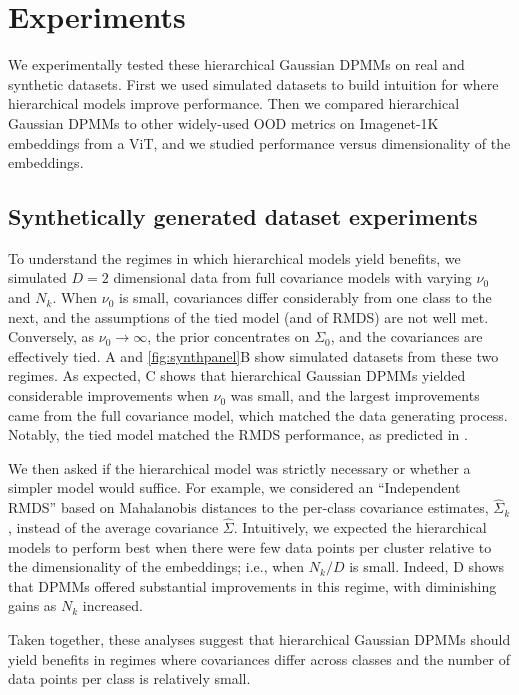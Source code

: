 \section{Experiments}
\label{sec:experiments}

We experimentally tested these hierarchical Gaussian DPMMs on real and synthetic datasets.
First we used simulated datasets to build intuition for where hierarchical models improve performance.
Then we compared hierarchical Gaussian DPMMs to other widely-used OOD metrics on Imagenet-1K embeddings from a ViT,
and we studied performance versus dimensionality of the embeddings.


\subsection{Synthetically generated dataset experiments}
To understand the regimes in which hierarchical models yield benefits, we
simulated $D=2$ dimensional data from full covariance models with varying
$\nu_0$ and $N_k$. When $\nu_0$ is small, covariances differ considerably from
one class to the next, and the assumptions of the tied model (and of RMDS) are
not well met. Conversely, as $\nu_0 \to \infty$, the prior concentrates on
$\Sigma_0$, and the covariances are effectively tied. A
and \ref{fig:synthpanel}B show simulated datasets from these two regimes. As
expected, C shows that hierarchical Gaussian DPMMs yielded
considerable improvements when $\nu_0$ was small, and the largest improvements
came from the full covariance model, which matched the data generating process.
Notably, the tied model matched the RMDS performance, as predicted in
.

We then asked if the hierarchical model was strictly necessary or whether a
simpler model would suffice. For example, we considered an ``Independent RMDS''
based on Mahalanobis distances to the per-class covariance estimates,
$\hat{\Sigma}_k$, instead of the average covariance $\hat{\Sigma}$.
Intuitively, we expected the hierarchical models to perform best when there
were few data points per cluster relative to the dimensionality of the
embeddings; i.e., when $N_k/D$ is small. Indeed, D shows
that DPMMs offered substantial improvements in this regime, with diminishing
gains as $N_k$ increased.

Taken together, these analyses suggest that hierarchical Gaussian DPMMs should
yield benefits in regimes where covariances differ across classes and the
number of data points per class is relatively small.

